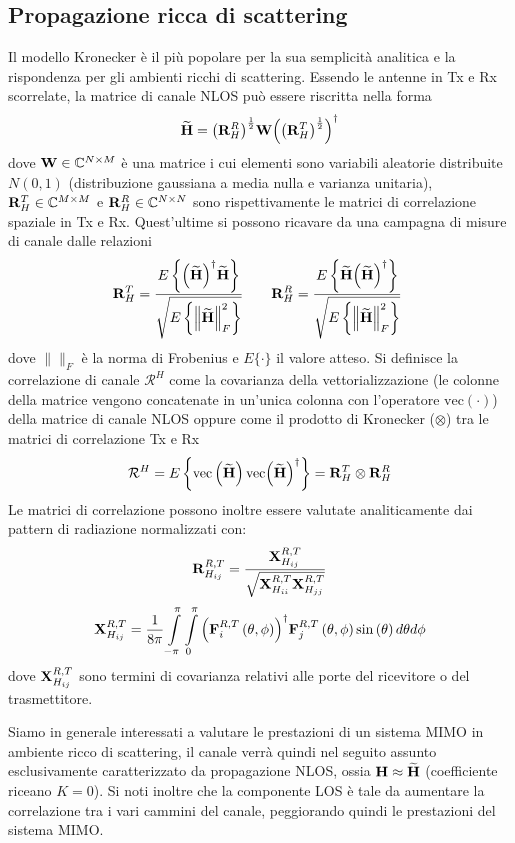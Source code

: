 \documentclass[technote]{IEEEtran}
\begin{document}
\subsection{Propagazione ricca di scattering}
Il modello Kronecker è il più popolare per la sua semplicità  analitica e la rispondenza per gli ambienti ricchi di scattering. Essendo le antenne in Tx e Rx scorrelate, la matrice di canale NLOS può essere riscritta nella forma
\[\widetilde {\bf{H}} = {\left( {{\bf{R}}_H^R} \right)^{\frac{1}{2}}}{\bf{W}}{\left( {{{\left( {{\bf{R}}_H^T} \right)}^{\frac{1}{2}}}} \right)^\dagger}\]
dove ${\bf{W}} \in \mathbb{C}{^{N \times M}}$ è una matrice i cui elementi sono variabili aleatorie distribuite $N(0,1)$ (distribuzione gaussiana a media nulla e varianza unitaria), ${\bf{R}}_H^T \in \mathbb{C}{^{M \times M}}$ e ${\bf{R}}_H^R \in \mathbb{C}{^{N \times N}}$ sono rispettivamente le matrici di correlazione spaziale in Tx e Rx. Quest'ultime si possono ricavare da una campagna di misure di canale dalle relazioni
\[{\bf{R}}_H^T = \frac{{E\left\{ {{{\left( {\widetilde {\bf{H}}} \right)}^\dagger}\widetilde {\bf{H}}} \right\}}}{{\sqrt {E\left\{ {\left\| {\widetilde {\bf{H}}} \right\|_F^2} \right\}} }} \qquad {\bf{R}}_H^R = \frac{{E\left\{ {\widetilde {\bf{H}}{{\left( {\widetilde {\bf{H}}} \right)}^\dagger}} \right\}}}{{\sqrt {E\left\{ {\left\| {\widetilde {\bf{H}}} \right\|_F^2} \right\}} }}\,\,\] dove $\| \|_F$ è la norma di Frobenius e $E\{\cdot\}$ il valore atteso.
Si definisce la correlazione di canale ${\mathcal{R}^H}$ come la covarianza della vettorializzazione (le colonne della matrice vengono concatenate in un'unica colonna con l'operatore $\mathrm{vec}(\cdot)$) della matrice di canale NLOS oppure come il prodotto di Kronecker ($\otimes$) tra le matrici di correlazione Tx e Rx
\[{\mathcal{R}^H} = E\left\{ {{\rm{vec}}\left( {\widetilde {\bf{H}}} \right){\rm{vec}}{{\left( {\widetilde {\bf{H}}} \right)}^\dagger}} \right\} = {\bf{R}}_H^T \otimes {\bf{R}}_H^R\]
Le matrici di correlazione possono inoltre essere valutate analiticamente dai pattern di radiazione normalizzati con:
\[{\bf{R}}_{{H_{ij}}}^{R,T} = \frac{{{\bf{X}}_{{H_{ij}}}^{R,T}}}{{\sqrt {{\bf{X}}_{{H_{ii}}}^{R,T}{\bf{X}}_{{H_{jj}}}^{R,T}} }}\]
\[{\bf{X}}_{{H_{ij}}}^{R,T} = \frac{1}{{8\pi }}\int\limits_{ - \pi }^\pi  {\int\limits_0^\pi  {{{\left( {{\bf{F}}_i^{R,T}\left( {\theta ,\phi } \right)} \right)}^\dagger}{\bf{F}}_j^{R,T}\left( {\theta ,\phi } \right)} } \sin \left( \theta  \right)d\theta d\phi \]
dove ${\bf{X}}_{{H_{ij}}}^{R,T}$ sono termini di covarianza relativi alle porte del ricevitore o del trasmettitore. 
\par Siamo in generale interessati a valutare le prestazioni di un sistema MIMO in ambiente ricco di scattering, il canale verrà quindi nel seguito assunto esclusivamente caratterizzato da propagazione NLOS, ossia ${\bf{H}} \approx \widetilde {\bf{H}}$ (coefficiente riceano $K = 0$). Si noti inoltre che la componente LOS è tale da aumentare la correlazione \cite{Sarris2007} tra i vari cammini del canale, peggiorando quindi le prestazioni del sistema MIMO.
\end{document}
